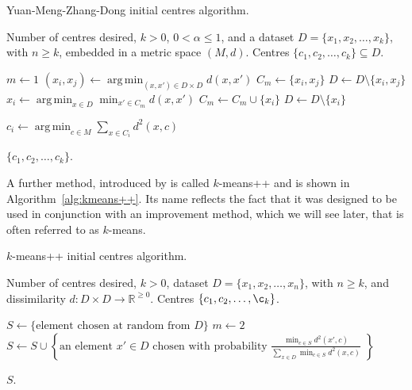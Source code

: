 \documentclass[a4paper]{report}
\DeclareMathOperator*{\argmin}{arg\,min}
\newcommand{\dset}{D}
\begin{document}
\begin{algorithm}[h]
  \caption{Yuan-Meng-Zhang-Dong initial centres algorithm.}
  \label{alg:yuan-meng}

  \begin{algorithmic}
    \Require Number of centres desired, $k > 0$, $0 < \alpha \leq 1$, and a
             dataset $\dset = \{x_1,x_2,\dotsc,x_k\}$, with $n \geq k$,
             embedded in a metric space $(M,d)$.
    \Ensure Centres $\{c_1,c_2,\dotsc,c_k\} \subseteq \dset$.

    \State $m \gets 1$
       \State $\displaystyle (x_i,x_j) \gets
               \argmin_{(x,x') \in \dset \times \dset} d(x,x')$
       \State $C_m \gets \{x_i,x_j\}$
       \State $\dset \gets \dset \setminus \{x_i,x_j\}$
          \State $\displaystyle x_i \gets
                  \argmin_{x \in \dset} \min_{x' \in C_m} d(x,x')$
          \State $C_m \gets C_m \cup \{x_i\}$
          \State $\dset \gets \dset \setminus \{x_i\}$
       \EndWhile
    \EndWhile

       \State $\displaystyle c_i \gets
               \argmin_{c \in M} \sum_{x \in C_i} d^2(x,c)$
    \EndFor

    \State \Return $\{c_1,c_2,\dotsc,c_k\}$.
  \end{algorithmic}
\end{algorithm}

A further method, introduced by \citet{arthur2007kmeans++} is called
$k$-means++ and is shown in Algorithm~\ref{alg:kmeans++}.  Its name reflects
the fact that it was designed to be used in conjunction with an improvement
method, which we will see later, that is often referred to as $k$-means.

\begin{algorithm}[h]
  \caption{$k$-means++ initial centres algorithm.}
  \label{alg:kmeans++}

  \begin{algorithmic}
    \Require Number of centres desired, $k > 0$, dataset $\dset =
             \{x_1,x_2,\dotsc,x_n\}$, with $n \geq k$, and dissimilarity
             $d \colon \dset \times \dset \to \mathbb{R}^{\geq 0}$.
    \Ensure Centres $\{c_1,c_2,\dotsc,\c_k\}$.

    \State $S \gets \{\text{element chosen at random from $\dset$}\}$
    \State $m \gets 2$
       \State $\displaystyle S \gets S \cup
               \left\{\text{an element $x' \in \dset$ chosen with probability
                            $\frac{\displaystyle \min_{c \in S} d^2(x',c)}
                             {\displaystyle
                              \sum_{x \in \dset} \min_{c \in S} d^2(x,c)}$
                            }\right\}$
    \EndWhile

    \State \Return $S$.
  \end{algorithmic}
\end{algorithm}
\end{document}
